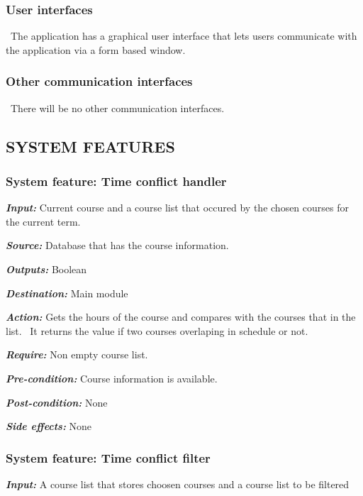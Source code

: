 \documentclass[twoside,letterpaper]{article}
\newcommand{\featuresection}[1] {
\subsubsection[System feature: #1]{\selectlanguage{english}\rmfamily\bfseries\color{black} System feature: #1}
}
\begin{document}
\subsubsection[User
interfaces]{\rmfamily\bfseries\color{black}
User interfaces}
{\color{black}
\foreignlanguage{english}{\ }\foreignlanguage{english}{The application has a graphical user interface that lets users communicate with the application via a form based window.}

\subsubsection[Other communication
interfaces]{\rmfamily\bfseries\color{black}
Other communication interfaces}
{\color{black}
\foreignlanguage{english}{\ }\foreignlanguage{english}{There will be no other communication interfaces.}}

\subsection[SYSTEM
FEATURES]{\rmfamily\bfseries\color{black}
SYSTEM FEATURES}


\featuresection{Time conflict handler}
\label{sssec:timeHandler}

\emph{\textbf{Input:}}  Current course and a course list that occured by the chosen courses for the current term.

\emph{\textbf{Source:}} Database that has the course information.

\emph{\textbf{Outputs:}} Boolean

\emph{\textbf{Destination:}} Main module

\emph{\textbf{Action:}} Gets the hours of the course and compares with the courses that in the list. \ It returns the value if two courses overlaping in schedule or not.

\emph{\textbf{Require:}} Non empty course list.

\emph{\textbf{Pre-condition: }} Course information is available.

\emph{\textbf{Post-condition: }} None

\emph{\textbf{Side effects:}} None



\featuresection{Time conflict filter}
\label{sssec:timeFilter}

\emph{\textbf{Input:}}  A course list that stores choosen courses and a course list to be filtered

}
\end{document}
